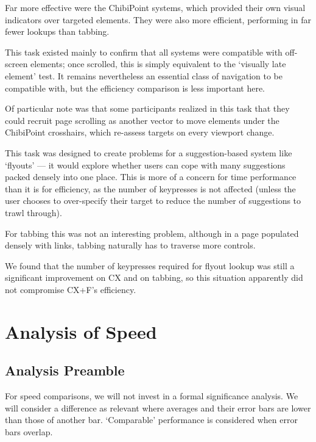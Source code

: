 \documentclass[11pt,openright,a4paper]{report}
\begin{document}
Far more effective were the ChibiPoint systems, which provided their own visual indicators over targeted elements. They were also more efficient, performing in far fewer lookups than tabbing.

This task existed mainly to confirm that all systems were compatible with off-screen elements; once scrolled, this is simply equivalent to the `visually late element' test. It remains nevertheless an essential class of navigation to be compatible with, but the efficiency comparison is less important here.

Of particular note was that some participants realized in this task that they could recruit page scrolling as another vector to move elements under the ChibiPoint crosshairs, which re-assess targets on every viewport change.

This task was designed to create problems for a suggestion-based system like `flyouts' --- it would explore whether users can cope with many suggestions packed densely into one place. This is more of a concern for time performance than it is for efficiency, as the number of keypresses is not affected (unless the user chooses to over-specify their target to reduce the number of suggestions to trawl through).

For tabbing this was not an interesting problem, although in a page populated densely with links, tabbing naturally has to traverse more controls.

We found that the number of keypresses required for flyout lookup was still a significant improvement on CX and on tabbing, so this situation apparently did not compromise CX+F's efficiency.

\clearpage
\section{Analysis of Speed}
\subsection{Analysis Preamble}
For speed comparisons, we will not invest in a formal significance analysis. We will consider a difference as relevant where averages and their error bars are lower than those of another bar. `Comparable' performance is considered when error bars overlap.
\end{document}
